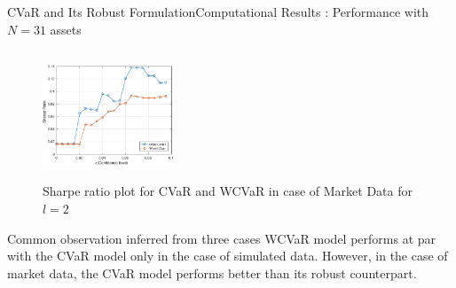 \documentclass{beamer}
\begin{document}
\begin{frame}{CVaR and Its Robust Formulation}{Computational Results : Performance with $N=31$ assets}

\begin{figure}[!h]
    \centering
   
    \includegraphics[height=3.825cm,width=0.35\textwidth]{CVaR/bse30_market/sr_cvar_2.eps}

  \caption{Sharpe ratio plot for CVaR and WCVaR in case of Market Data for $l=2$}
  \label{fig:6.1}
\end{figure}

\begin{block}{Common observation inferred from three cases}
WCVaR model performs at par with the CVaR model only in the case of simulated data. However, in the case of market data, the CVaR model performs better than its robust counterpart.
\end{block}
\end{frame}
\end{document}
